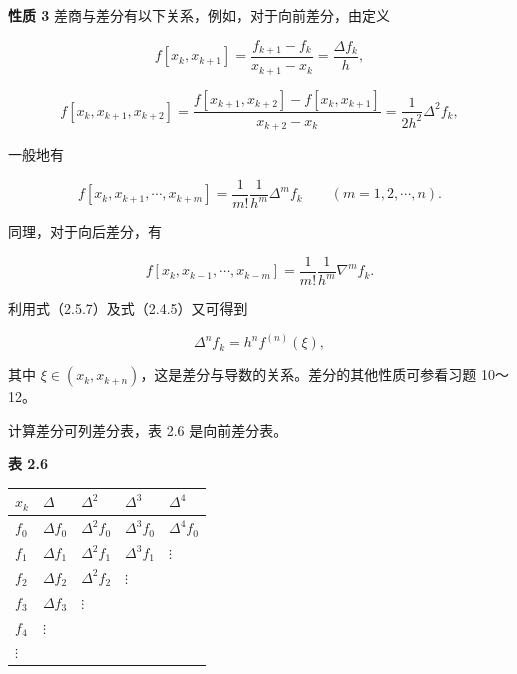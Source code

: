 \documentclass[
  10pt,
  fontset=fandol]{ctexart}
\newcounter{none} %
\begin{document}
\textbf{性质 3} 差商与差分有以下关系，例如，对于向前差分，由定义

\[
f[x_k,x_{k+1}]=\frac{f_{k+1}-f_k}{x_{k+1}-x_k}=\frac{\Delta f_k}{h},
\]

\[
f[x_k,x_{k+1},x_{k+2}]=\frac{f[x_{k+1},x_{k+2}]-f[x_k,x_{k+1}]}{x_{k+2}-x_k}=\frac{1}{2h^2}\Delta^2 f_k,
\]

一般地有

\[
f[x_k,x_{k+1},\cdots,x_{k+m}]=\frac{1}{m!}\frac{1}{h^m}\Delta^m f_k\qquad(m=1,2,\cdots,n).
\tag{2.5.7}
\]

同理，对于向后差分，有

\[
f[x_k,x_{k-1},\cdots,x_{k-m}]=\frac{1}{m!}\frac{1}{h^m}\nabla^m f_k.
\tag{2.5.8}
\]

利用式（2.5.7）及式（2.4.5）又可得到

\[
\Delta^n f_k=h^n f^{(n)}(\xi),
\tag{2.5.9}
\]

其中 \(\xi\in(x_k,x_{k+n})\)，这是差分与导数的关系。差分的其他性质可参看习题 10～12。

计算差分可列差分表，表 2.6 是向前差分表。

\textbf{表 2.6}

{\def\LTcaptype{none} %
\begin{longtable}[]{@{}
  >{\raggedright\arraybackslash}p{}
  >{\raggedright\arraybackslash}p{}
  >{\raggedright\arraybackslash}p{}
  >{\raggedright\arraybackslash}p{}
  >{\raggedright\arraybackslash}p{}@{}}
\toprule\noalign{}
\begin{minipage}[b]{\linewidth}\raggedright
\(x_k\)
\end{minipage} & \begin{minipage}[b]{\linewidth}\raggedright
\(\Delta\)
\end{minipage} & \begin{minipage}[b]{\linewidth}\raggedright
\(\Delta^2\)
\end{minipage} & \begin{minipage}[b]{\linewidth}\raggedright
\(\Delta^3\)
\end{minipage} & \begin{minipage}[b]{\linewidth}\raggedright
\(\Delta^4\)
\end{minipage} \\
\midrule\noalign{}
\endhead
\bottomrule\noalign{}
\endlastfoot
\(f_0\) & \(\Delta f_0\) & \(\Delta^2 f_0\) & \(\Delta^3 f_0\) & \(\Delta^4 f_0\) \\
\(f_1\) & \(\Delta f_1\) & \(\Delta^2 f_1\) & \(\Delta^3 f_1\) & \(\vdots\) \\
\(f_2\) & \(\Delta f_2\) & \(\Delta^2 f_2\) & \(\vdots\) & \\
\(f_3\) & \(\Delta f_3\) & \(\vdots\) & & \\
\(f_4\) & \(\vdots\) & & & \\
\(\vdots\) & & & & \\
\end{longtable}
}
\end{document}
